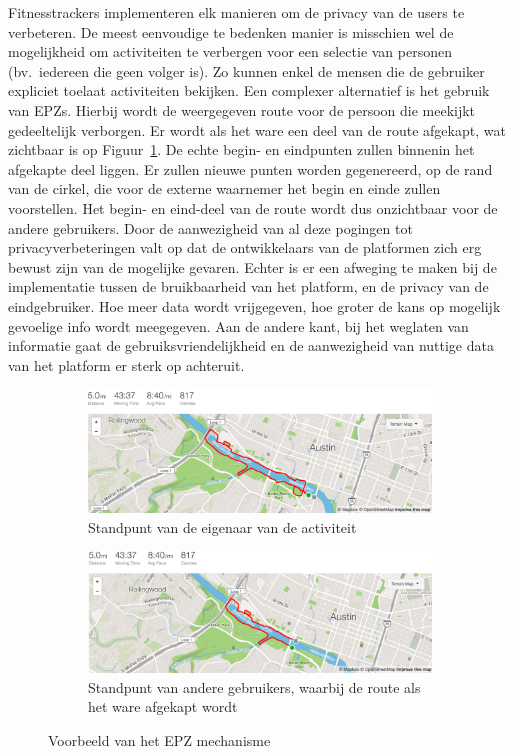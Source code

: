 Fitnesstrackers implementeren elk manieren om de privacy van de users te
verbeteren. De meest eenvoudige te bedenken manier is misschien wel de
mogelijkheid om activiteiten te verbergen voor een selectie van personen (bv.\
iedereen die geen volger is). Zo kunnen enkel de mensen die de gebruiker
expliciet toelaat activiteiten bekijken. Een complexer alternatief is het
gebruik van \acp{EPZ}. Hierbij wordt de weergegeven route voor de persoon die
meekijkt gedeeltelijk verborgen. Er wordt als het ware een deel van de route
afgekapt, wat zichtbaar is op Figuur~\ref{fig:example_hassan}. De echte begin-
en eindpunten zullen binnenin het afgekapte deel liggen. Er zullen nieuwe
punten worden gegenereerd, op de rand van de cirkel, die voor de externe
waarnemer het begin en einde zullen voorstellen. Het begin- en eind-deel van de
route wordt dus onzichtbaar voor de andere gebruikers. Door de aanwezigheid van
al deze pogingen tot privacyverbeteringen valt op dat de ontwikkelaars van de
platformen zich erg bewust zijn van de mogelijke gevaren. Echter is er een
afweging te maken bij de implementatie tussen de bruikbaarheid van het
platform, en de privacy van de eindgebruiker. Hoe meer data wordt vrijgegeven,
hoe groter de kans op mogelijk gevoelige info wordt meegegeven. Aan de andere
kant, bij het weglaten van informatie gaat de gebruiksvriendelijkheid en de
aanwezigheid van nuttige data van het platform er sterk op achteruit.
\begin{figure}[h]
    \centering
    \begin{subfigure}[b]{0.8\linewidth}
        \includegraphics[width=\linewidth]{fig/EPZ-mechanisme/Hassan_examle_before.png}
        \caption{Standpunt van de eigenaar van de activiteit}
    \end{subfigure}
    \begin{subfigure}[b]{0.8\linewidth}
        \includegraphics[width=\linewidth]{fig/EPZ-mechanisme/Hassan_examle_after.png}
        \caption{Standpunt van andere gebruikers, waarbij de route als het ware afgekapt wordt}
    \end{subfigure}
    \caption{Voorbeeld van het EPZ mechanisme~\cite{sec18has3:online}}\label{fig:example_hassan}
\end{figure}

